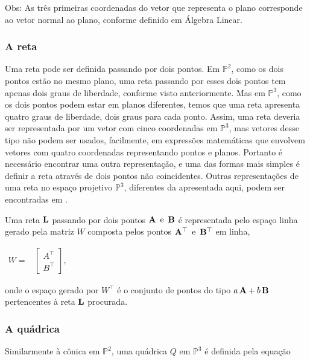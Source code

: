 Obs: As três primeiras coordenadas do vetor que representa o plano corresponde ao vetor normal ao plano, conforme definido em Álgebra Linear.
\\


\subsubsection{A reta}

Uma reta pode ser definida passando por dois pontos. Em $\mathbb{P}^2$, como os dois pontos estão no mesmo plano, uma reta passando por esses dois pontos tem apenas dois graus de liberdade, conforme visto anteriormente. Mas em $\mathbb{P}^3$, como os dois pontos podem estar em planos diferentes, temos que uma reta apresenta quatro graus de liberdade, dois graus para cada ponto. Assim, uma reta deveria ser representada por um vetor com cinco coordenadas em $\mathbb{P}^3$, mas vetores desse tipo não podem ser usados, facilmente, em expressões matemáticas que envolvem vetores com quatro coordenadas representando pontos e planos. Portanto é necessário encontrar uma outra representação, e uma das formas mais simples é definir a reta através de dois pontos não coincidentes. Outras representações de uma reta no espaço projetivo $\mathbb{P}^3$, diferentes da apresentada aqui, podem ser encontradas em \cite{Hartley2004}.


Uma reta ${\bf L}$ passando por dois pontos ${\bf A} \,\,\, \text{e} \,\,\, {\bf B}$ é representada pelo espaço linha gerado pela matriz $W$ composta pelos pontos ${\bf A}^\top \,\,\,\text{e} \,\,\, {\bf B}^\top$ em linha,

\begin{center}
$
\begin{array}{cc}
W = 
& \begin{bmatrix}
  A^\top\\
  B^\top
  \end{bmatrix},
\end{array}
$
\end{center}
onde o espaço gerado por $W^\top$ é o conjunto de pontos do tipo $a\,{\bf A} + b\,{\bf B}$ pertencentes à reta ${\bf L}$ procurada. \\


\subsubsection{A quádrica}


Similarmente à cônica em $\mathbb{P}^2$, uma quádrica $Q$ em $\mathbb{P}^3$ é definida pela equação


